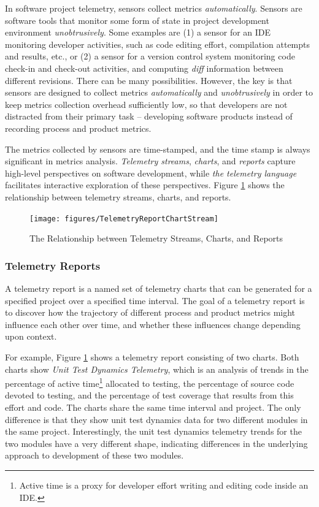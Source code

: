 In software project telemetry, sensors collect metrics \textit{automatically}. Sensors are software tools that monitor some form of state in project development environment \textit{unobtrusively}. Some examples are (1) a sensor for an IDE monitoring developer activities, such as code editing effort, compilation attempts and results, etc., or (2) a sensor for a version control system monitoring code check-in and check-out activities, and computing \textit{diff} information between different revisions. There can be many possibilities. However, the key is that sensors are designed to collect metrics \textit{automatically} and \textit{unobtrusively} in order to keep metrics collection overhead sufficiently low, so that developers are not distracted from their primary task -- developing software products instead of recording process and product metrics.

The metrics collected by sensors are time-stamped, and the time stamp is always significant in metrics analysis. \textit{Telemetry streams}, \textit{charts}, and \textit{reports} capture high-level perspectives on software development, while \textit{the telemetry language} facilitates interactive exploration of these perspectives. Figure \ref{fig:TelemetryReportChartStream} shows the relationship between telemetry streams, charts, and reports. 

\begin{figure}[p]
  \centering
  \texttt{[image: figures/TelemetryReportChartStream]}
  \caption{The Relationship between Telemetry Streams, Charts, and Reports} 
  \label{fig:TelemetryReportChartStream}
\end{figure}





\subsubsection{Telemetry Reports}

A telemetry report is a named set of telemetry charts that can be generated for a specified project over a specified time interval. The goal of a telemetry report is to discover how the trajectory of different process and product metrics might influence each other over time, and whether these influences change depending upon context.

For example, Figure \ref{fig:TelemetryReportChartStream} shows a telemetry report consisting of two charts. Both charts show \textit{Unit Test Dynamics Telemetry}, which is an analysis of trends in the percentage of active time\footnote{Active time is a proxy for developer effort writing and editing code inside an IDE.} allocated to testing, the percentage of source code devoted to testing, and the percentage of test coverage that results from this effort and code. The charts share the same time interval and project. The only difference is that they show unit test dynamics data for two different modules in the same project. Interestingly, the unit test dynamics telemetry trends for the two modules have a very different shape, indicating differences in the underlying approach to development of these two modules.



